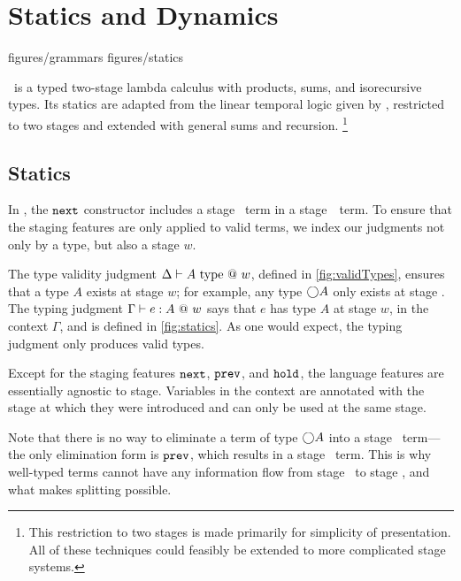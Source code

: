 
\section{\texorpdfstring{\lang}{λ12} Statics and Dynamics}
\label{sec:semantics}

 {figures/grammars}
 {figures/statics}

\lang\ is a typed two-stage lambda calculus with products, sums, and isorecursive types.
Its statics are adapted from the linear temporal logic given by \cite{davies96},
restricted to two stages and extended with general sums and recursion.%
\footnote{This restriction to two stages is made primarily for simplicity of
presentation. All of these techniques could feasibly be extended to more
complicated stage systems.}


\subsection{Statics}

In \lang, the ${\tt next}$ constructor includes a stage \bbtwo\ term in a
stage~\bbone\ term. To ensure that the staging features are only applied to
valid terms, we index our judgments not only by a type, but also a stage $w$.

The type validity judgment $\Delta \vdash A ~{\rm type}~@~w$, defined in
\cref{fig:validTypes}, ensures that a type $A$ exists at stage $w$; for
example, any type $\bigcirc A$ only exists at stage \bbone.  The typing judgment
$\Gamma{} \vdash {e}:{A}~@~w$ says that $e$ has type $A$ at stage $w$, in the context
$\Gamma$, and is defined in \cref{fig:statics}.  As one would expect, the
typing judgment only produces valid types.

Except for the staging features ${\tt next}$, ${\tt prev}$, and ${\tt hold}$, the language
features are essentially agnostic to stage. Variables in the context are
annotated with the stage at which they were introduced and can only be used at
the same stage.

Note that there is no way to eliminate a term of type $\bigcirc A$ into a stage
\bbone\ term---the only elimination form is ${\tt prev}$, which results in a stage
\bbtwo\ term. This is why well-typed terms cannot have any information flow
from stage \bbtwo\ to stage \bbone, and what makes splitting possible.

